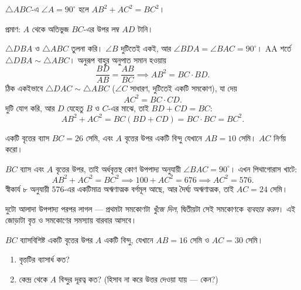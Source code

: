 \documentclass[11pt]{article}
\begin{document}
\begin{idea}[পিথাগোরাসের উপপাদ্য]
$\triangle ABC$-এ $\angle A = 90^\circ$ হলে $AB^2 + AC^2 = BC^2$।

\begin{center}
\end{center}

\noindent
প্রমাণ: $A$ থেকে অতিভুজ $BC$-এর উপর লম্ব $AD$ টানি।

$\triangle DBA$ ও $\triangle ABC$ তুলনা করি। $\angle B$ দুটিতেই একই, আর
$\angle BDA = \angle BAC = 90^\circ$। AA শর্তে $\triangle DBA \sim \triangle ABC$।
অনুরূপ বাহুর অনুপাত সমান হওয়ায়
\[
  \frac{BD}{AB} = \frac{AB}{BC} \implies AB^2 = BC \cdot BD .
\]
ঠিক একইভাবে $\triangle DAC \sim \triangle ABC$ ($\angle C$ সাধারণ, দুটিতেই একটি
সমকোণ), যা দেয়
\[
  AC^2 = BC \cdot CD .
\]
দুটি যোগ করি, আর $D$ যেহেতু $B$ ও $C$-এর মাঝে, তাই $BD + CD = BC$:
\[
  AB^2 + AC^2 = BC(BD + CD) = BC \cdot BC = BC^2 .
\]
\end{idea}

\begin{example}
একটি বৃত্তের ব্যাস $BC = 26$ সেমি, এবং $A$ বৃত্তের উপর একটি বিন্দু যেখানে
$AB = 10$ সেমি। $AC$ নির্ণয় করো।
\end{example}

\begin{solbox}
$BC$ ব্যাস এবং $A$ বৃত্তের উপর, তাই অর্ধবৃত্তস্থ কোণ উপপাদ্য অনুযায়ী
$\angle BAC = 90^\circ$। এখন পিথাগোরাস খাটে:
\[
  AB^2 + AC^2 = BC^2 \implies 100 + AC^2 = 676 \implies AC^2 = 576 .
\]
স্বীকার্য ৮ অনুযায়ী $576$-এর একটিমাত্র অঋণাত্মক বর্গমূল আছে, আর দৈর্ঘ্য
অঋণাত্মক, তাই $AC = 24$ সেমি।

দুটো আলাদা উপপাদ্য পরপর লাগল --- প্রথমটা সমকোণটা \emph{খুঁজে দিল}, দ্বিতীয়টা
সেই সমকোণকে \emph{ব্যবহার করল}। এই জোড়াটা বৃত্ত ও সমকোণের সমস্যায় বারবার আসবে।
\end{solbox}

 $BC$ ব্যাসবিশিষ্ট একটি বৃত্তের উপর $A$ একটি বিন্দু, যেখানে $AB = 16$
সেমি ও $AC = 30$ সেমি।
\begin{enumerate}
  \item বৃত্তটির ব্যাসার্ধ কত?
  \item কেন্দ্র থেকে $A$ বিন্দুর দূরত্ব কত? (হিসাব না করে উত্তর দেওয়া যায় ---
        কেন?)
\end{enumerate}
\end{document}
